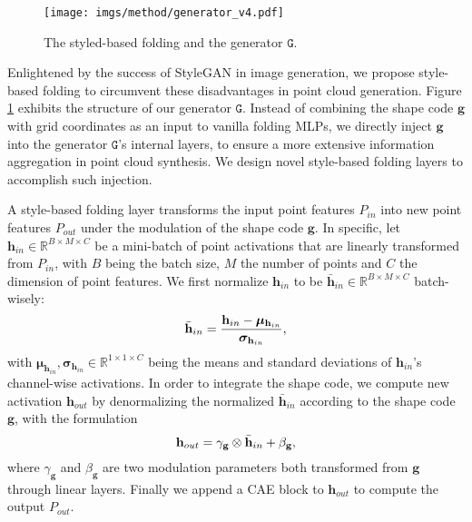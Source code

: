 \documentclass[final]{cvpr}
\begin{document}
\begin{figure}[t]
\centering
\texttt{[image: imgs/method/generator\_v4.pdf]}
 \footnotesize
    \caption{The styled-based folding and the generator $\mathtt{G}$.}
\label{fig:generator}
\vspace{-1em}
\end{figure}

Enlightened by the success of StyleGAN \cite{karras2019style} in image generation, we propose style-based folding to circumvent these disadvantages in point cloud generation. 
Figure \ref{fig:generator} exhibits the structure of our generator $\mathtt{G}$.
Instead of combining the shape code $\mathbf{g}$ with grid coordinates as an input to vanilla folding MLPs, we directly inject $\mathbf{g}$ into the generator $\mathtt{G}$'s internal layers, to ensure a more extensive information aggregation in point cloud synthesis.
We design novel style-based folding layers to accomplish such injection. 

A style-based folding layer transforms the input point features $P_{in}$ into new point features $P_{out}$ under the modulation of the shape code $\mathbf{g}$.
In specific, let $\mathbf{h}_{in} \in \mathbb{R}^{B \times M\times C}$ be a mini-batch of point activations that are linearly transformed from $P_{in}$, with $B$ being the batch size, $M$ the number of points and $C$ the dimension of point features. We first normalize $\mathbf{h}_{in}$ to be $\bar{\mathbf{h}}_{in} \in \mathbb{R}^{B \times M\times C}$ batch-wisely: 
\vspace{-0.5em}
\begin{equation}
\vspace{-0.5em}
\bar{\mathbf{h}}_{in} = \frac{\mathbf{h}_{in} - \bm{\mu}_{\mathbf{h}_{in}}}{\bm{\sigma}_{\mathbf{h}_{in}}},
\end{equation}
with $\bm{\mu}_{\mathbf{h}_{in}}, \bm{\sigma}_{\mathbf{h}_{in}} \in \mathbb{R}^{1\times 1\times C}$ being the means and standard deviations of $\mathbf{h}_{in}$'s channel-wise activations.
In order to integrate the shape code, we compute new activation $\mathbf{h}_{out}$ by denormalizing the normalized $\bar{\mathbf{h}}_{in}$ according to the shape code $\mathbf{g}$, with the formulation
\vspace{-0.5em}
\begin{equation}
\vspace{-0.5em}
\mathbf{h}_{out} = \gamma_{\mathbf{g}} \otimes \bar{\textbf{h}}_{in} + \beta_{\mathbf{g}},
\end{equation} 
where $\gamma_{\mathbf{g}}$ and $\beta_{\mathbf{g}}$ are two modulation parameters both transformed from $\mathbf{g}$ through linear layers.
Finally we append a CAE block to $\mathbf{h}_{out}$ to compute the output $P_{out}$.
\end{document}
